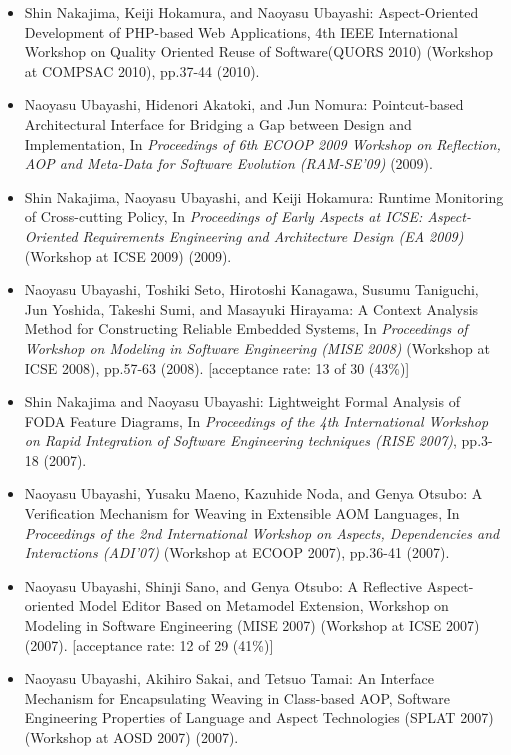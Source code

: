 \documentclass{jarticle}
\begin{document}
\begin{itemize}
\item Shin Nakajima, Keiji Hokamura, and Naoyasu Ubayashi:
Aspect-Oriented Development of PHP-based Web Applications,
4th IEEE International Workshop on Quality Oriented Reuse of Software(QUORS 2010) (Workshop at COMPSAC 2010),
pp.37-44 (2010).

\item Naoyasu Ubayashi, Hidenori Akatoki, and Jun Nomura:
Pointcut-based Architectural Interface for Bridging a Gap between Design and Implementation,
In {\em Proceedings of 6th ECOOP 2009 Workshop on Reflection, AOP and Meta-Data for Software Evolution (RAM-SE'09)} (2009).

\item Shin Nakajima, Naoyasu Ubayashi, and Keiji Hokamura:
Runtime Monitoring of Cross-cutting Policy,
In {\em Proceedings of Early Aspects at ICSE: Aspect-Oriented Requirements Engineering and Architecture Design (EA 2009)} (Workshop at ICSE 2009) (2009).

\item Naoyasu Ubayashi, Toshiki Seto, Hirotoshi Kanagawa, Susumu Taniguchi, Jun Yoshida, Takeshi Sumi, and Masayuki Hirayama:
A Context Analysis Method for Constructing Reliable Embedded Systems,
In {\em Proceedings of Workshop on Modeling in Software Engineering (MISE 2008)} (Workshop at ICSE 2008),
pp.57-63 (2008).
[acceptance rate: 13 of 30 (43\%)]

\item Shin Nakajima and Naoyasu Ubayashi:
Lightweight Formal Analysis of FODA Feature Diagrams,
In {\em Proceedings of the 4th International Workshop on Rapid Integration of Software Engineering techniques (RISE 2007)},
pp.3-18 (2007).

\item Naoyasu Ubayashi, Yusaku Maeno, Kazuhide Noda, and Genya Otsubo:
A Verification Mechanism for Weaving in Extensible AOM Languages,
In {\em Proceedings of the 2nd International Workshop on Aspects, Dependencies and Interactions (ADI'07)} (Workshop at ECOOP 2007),
pp.36-41 (2007).

\item Naoyasu Ubayashi, Shinji Sano, and Genya Otsubo:
A Reflective Aspect-oriented Model Editor Based on Metamodel Extension,
Workshop on Modeling in Software Engineering (MISE 2007) (Workshop at ICSE 2007) (2007).
[acceptance rate: 12 of 29 (41\%)]

\item Naoyasu Ubayashi, Akihiro Sakai, and Tetsuo Tamai:
An Interface Mechanism for Encapsulating Weaving in Class-based AOP,
Software Engineering Properties of Language and Aspect Technologies (SPLAT 2007) (Workshop at AOSD 2007) (2007).


\end{itemize}
\end{document}
